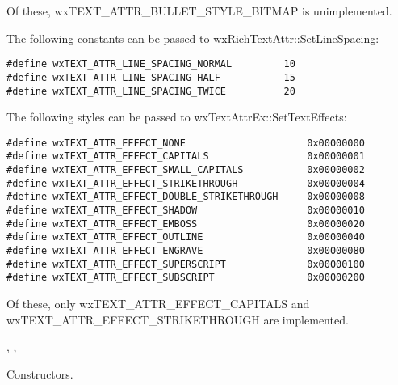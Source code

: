 Of these, wxTEXT\_ATTR\_BULLET\_STYLE\_BITMAP is unimplemented.

The following constants can be passed to wxRichTextAttr::SetLineSpacing:

{\small
\begin{verbatim}
#define wxTEXT_ATTR_LINE_SPACING_NORMAL         10
#define wxTEXT_ATTR_LINE_SPACING_HALF           15
#define wxTEXT_ATTR_LINE_SPACING_TWICE          20
\end{verbatim}
}

The following styles can be passed to wxTextAttrEx::SetTextEffects:

{\small
\begin{verbatim}
#define wxTEXT_ATTR_EFFECT_NONE                     0x00000000
#define wxTEXT_ATTR_EFFECT_CAPITALS                 0x00000001
#define wxTEXT_ATTR_EFFECT_SMALL_CAPITALS           0x00000002
#define wxTEXT_ATTR_EFFECT_STRIKETHROUGH            0x00000004
#define wxTEXT_ATTR_EFFECT_DOUBLE_STRIKETHROUGH     0x00000008
#define wxTEXT_ATTR_EFFECT_SHADOW                   0x00000010
#define wxTEXT_ATTR_EFFECT_EMBOSS                   0x00000020
#define wxTEXT_ATTR_EFFECT_OUTLINE                  0x00000040
#define wxTEXT_ATTR_EFFECT_ENGRAVE                  0x00000080
#define wxTEXT_ATTR_EFFECT_SUPERSCRIPT              0x00000100
#define wxTEXT_ATTR_EFFECT_SUBSCRIPT                0x00000200
\end{verbatim}
}

Of these, only wxTEXT\_ATTR\_EFFECT\_CAPITALS and wxTEXT\_ATTR\_EFFECT\_STRIKETHROUGH are implemented.


, , 


\label{wxrichtextattrwxrichtextattr}




Constructors.

\label{wxrichtextattrcopyto}

